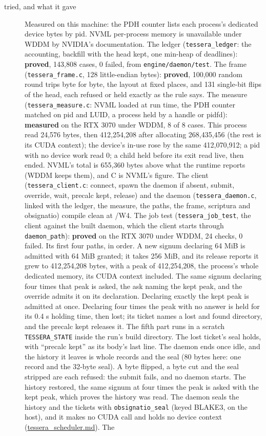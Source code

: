 \begin{description}
\item[{tried, and what it gave}] Measured on this machine: the PDH counter lists each process's dedicated device bytes by pid. NVML per-process memory is unavailable under WDDM by NVIDIA's documentation. The ledger (\texttt{tessera\_\allowbreak{}ledger}: the accounting, backfill with the head kept, one min-heap of deadlines): \textbf{proved}, 143,808 cases, 0 failed, from \texttt{engine/\allowbreak{}daemon/\allowbreak{}test}. The frame (\texttt{tessera\_\allowbreak{}frame.\allowbreak{}c}, 128 little-endian bytes): \textbf{proved}, 100,000 random round trips byte for byte, the layout at fixed places, and 131 single-bit flips of the head, each refused or held exactly as the rule says. The measure (\texttt{tessera\_\allowbreak{}measure.\allowbreak{}c}: NVML loaded at run time, the PDH counter matched on pid and LUID, a process held by a handle or pidfd): \textbf{measured} on the RTX 3070 under WDDM, 8 of 8 cases. This process read 24,576 bytes, then 412,254,208 after allocating 268,435,456 (the rest is its CUDA context); the device's in-use rose by the same 412,070,912; a pid with no device work read 0; a child held before its exit read live, then ended. NVML's total is 655,360 bytes above what the runtime reports (WDDM keeps them), and C is NVML's figure. The client (\texttt{tessera\_\allowbreak{}client.\allowbreak{}c}: connect, spawn the daemon if absent, submit, override, wait, precalc kept, release) and the daemon (\texttt{tessera\_\allowbreak{}daemon.\allowbreak{}c}, linked with the ledger, the measure, the paths, the frame, scriptura and obsignatio) compile clean at /W4. The job test (\texttt{tessera\_\allowbreak{}job\_\allowbreak{}test}, the client against the built daemon, which the client starts through \texttt{daemon\_\allowbreak{}path}): \textbf{proved} on the RTX 3070 under WDDM, 24 checks, 0 failed. Its first four paths, in order. A new signum declaring 64 MiB is admitted with 64 MiB granted; it takes 256 MiB, and its release reports it grew to 412,254,208 bytes, with a peak of 412,254,208, the process's whole dedicated memory, its CUDA context included. The same signum declaring four times that peak is asked, the ask naming the kept peak, and the override admits it on its declaration. Declaring exactly the kept peak is admitted at once. Declaring four times the peak with no answer is held for its 0.4 s holding time, then lost; its ticket names a lost and found directory, and the precalc kept releases it. The fifth part runs in a scratch \texttt{TESSERA\_\allowbreak{}STATE} inside the run's build directory. The lost ticket's seal holds, with “precalc kept” as its body's last line. The daemon ends once idle, and the history it leaves is whole records and the seal (80 bytes here: one record and the 32-byte seal). A byte flipped, a byte cut and the seal stripped are each refused: the submit fails, and no daemon starts. The history restored, the same signum at four times the peak is asked with the kept peak, which proves the history was read. The daemon seals the history and the tickets with \texttt{obsignatio\_\allowbreak{}seal} (keyed BLAKE3, on the host), and it makes no CUDA call and holds no device context (\hyperref[chap:tessera-scheduler]{tessera\_\allowbreak{}scheduler.md}). The 
\end{description}
